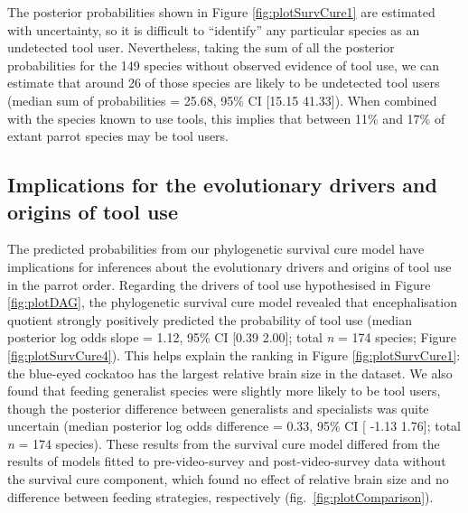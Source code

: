\documentclass[
  man,floatsintext]{apa6}
\begin{document}
The posterior probabilities shown in Figure \ref{fig:plotSurvCure1} are
estimated with uncertainty, so it is difficult to ``identify'' any particular
species as an undetected tool user. Nevertheless, taking the sum of all the
posterior probabilities for the
149 species without
observed evidence of tool use, we can estimate that around
26 of those species are likely to be
undetected tool users (median sum of probabilities =
25.68, 95\% CI
{[}15.15
41.33{]}). When combined with the
species known to use tools, this implies that between 11\% and 17\% of extant
parrot species may be tool users.

\hypertarget{implications-for-the-evolutionary-drivers-and-origins-of-tool-use}{%
\subsection{Implications for the evolutionary drivers and origins of tool use}\label{implications-for-the-evolutionary-drivers-and-origins-of-tool-use}}

The predicted probabilities from our phylogenetic survival cure model have
implications for inferences about the evolutionary drivers and origins of tool
use in the parrot order. Regarding the drivers of tool use hypothesised in
Figure \ref{fig:plotDAG}, the phylogenetic survival cure model revealed that
encephalisation quotient strongly positively predicted the probability of tool
use (median posterior log odds slope = 1.12, 95\%
CI {[}0.39
2.00{]}; total \emph{n} = 174
species; Figure \ref{fig:plotSurvCure4}). This helps explain the ranking in
Figure \ref{fig:plotSurvCure1}: the blue-eyed cockatoo has the largest relative
brain size in the dataset. We also found that feeding generalist species were
slightly more likely to be tool users, though the posterior difference between
generalists and specialists was quite uncertain (median posterior log odds
difference = 0.33, 95\% CI {[}
-1.13 1.76{]}; total
\emph{n} = 174 species). These results from the survival cure model
differed from the results of models fitted to pre-video-survey and
post-video-survey data without the survival cure component, which found no
effect of relative brain size and no difference between feeding strategies,
respectively (fig.~\ref{fig:plotComparison}).
\end{document}
